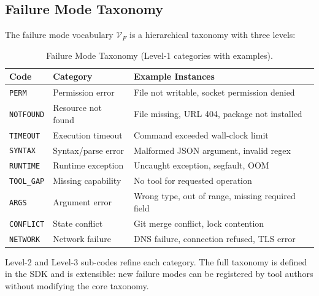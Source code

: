 \subsection{Failure Mode Taxonomy}

The failure mode vocabulary $\mathcal{V}_F$ is a hierarchical taxonomy with
three levels:

\begin{table}[H]
\centering
\caption{Failure Mode Taxonomy (Level-1 categories with examples).}
\label{tab:failure_modes}
\begin{tabular}{llp{6cm}}
\toprule
Code & Category & Example Instances \\
\midrule
\texttt{PERM} & Permission error & File not writable, socket permission denied \\
\texttt{NOTFOUND} & Resource not found & File missing, URL 404, package not installed \\
\texttt{TIMEOUT} & Execution timeout & Command exceeded wall-clock limit \\
\texttt{SYNTAX} & Syntax/parse error & Malformed JSON argument, invalid regex \\
\texttt{RUNTIME} & Runtime exception & Uncaught exception, segfault, OOM \\
\texttt{TOOL\_GAP} & Missing capability & No tool for requested operation \\
\texttt{ARGS} & Argument error & Wrong type, out of range, missing required field \\
\texttt{CONFLICT} & State conflict & Git merge conflict, lock contention \\
\texttt{NETWORK} & Network failure & DNS failure, connection refused, TLS error \\
\bottomrule
\end{tabular}
\end{table}

Level-2 and Level-3 sub-codes refine each category. The full taxonomy is
defined in the SDK and is extensible: new failure modes can be registered by
tool authors without modifying the core taxonomy.

